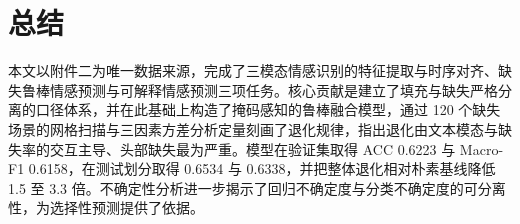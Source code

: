 \documentclass[withoutpreface,bwprint]{cumcmthesis}
\begin{document}
\section{总结}
本文以附件二为唯一数据来源，完成了三模态情感识别的特征提取与时序对齐、缺失鲁棒情感预测与可解释情感预测三项任务。核心贡献是建立了填充与缺失严格分离的口径体系，并在此基础上构造了掩码感知的鲁棒融合模型，通过 120 个缺失场景的网格扫描与三因素方差分析定量刻画了退化规律，指出退化由文本模态与缺失率的交互主导、头部缺失最为严重。模型在验证集取得 ACC 0.6223 与 Macro-F1 0.6158，在测试划分取得 0.6534 与 0.6338，并把整体退化相对朴素基线降低 1.5 至 3.3 倍。不确定性分析进一步揭示了回归不确定度与分类不确定度的可分离性，为选择性预测提供了依据。

\end{document}
